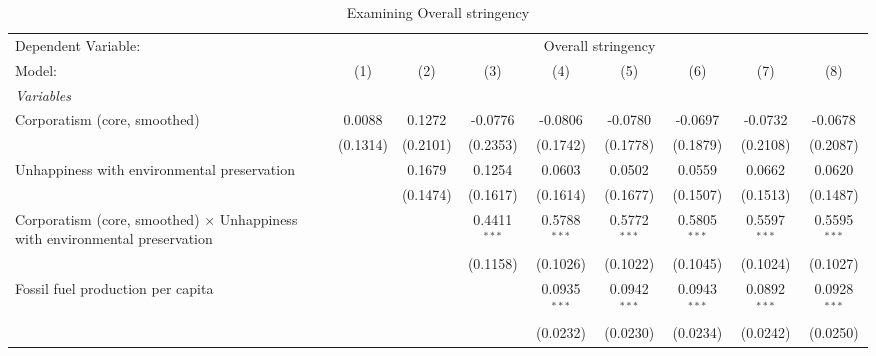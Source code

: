 
\begin{table}[htbp]
   \caption{Examining Overall stringency}
   \centering
   \begin{tabular}{lcccccccc}
      \tabularnewline \midrule \midrule
      Dependent Variable: & \multicolumn{8}{c}{Overall stringency}\\
      Model:                                                                             & (1)                   & (2)      & (3)            & (4)            & (5)            & (6)            & (7)            & (8)\\  
      \midrule
      \emph{Variables}\\
      Corporatism (core, smoothed)                                                       & 0.0088                & 0.1272   & -0.0776        & -0.0806        & -0.0780        & -0.0697        & -0.0732        & -0.0678\\   
                                                                                         & (0.1314)              & (0.2101) & (0.2353)       & (0.1742)       & (0.1778)       & (0.1879)       & (0.2108)       & (0.2087)\\   
      Unhappiness with environmental preservation                                        &                       & 0.1679   & 0.1254         & 0.0603         & 0.0502         & 0.0559         & 0.0662         & 0.0620\\   
                                                                                         &                       & (0.1474) & (0.1617)       & (0.1614)       & (0.1677)       & (0.1507)       & (0.1513)       & (0.1487)\\   
      Corporatism (core, smoothed) $\times$ Unhappiness with environmental preservation  &                       &          & 0.4411$^{***}$ & 0.5788$^{***}$ & 0.5772$^{***}$ & 0.5805$^{***}$ & 0.5597$^{***}$ & 0.5595$^{***}$\\   
                                                                                         &                       &          & (0.1158)       & (0.1026)       & (0.1022)       & (0.1045)       & (0.1024)       & (0.1027)\\   
      Fossil fuel production per capita                                                  &                       &          &                & 0.0935$^{***}$ & 0.0942$^{***}$ & 0.0943$^{***}$ & 0.0892$^{***}$ & 0.0928$^{***}$\\   
                                                                                         &                       &          &                & (0.0232)       & (0.0230)       & (0.0234)       & (0.0242)       & (0.0250)\\   

\end{tabular}
\end{table}

